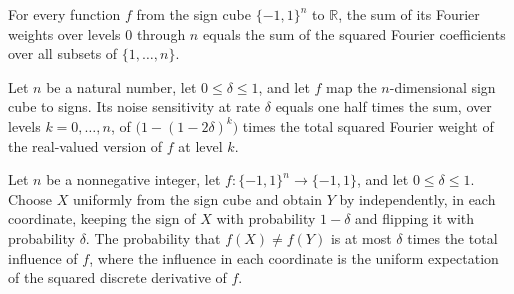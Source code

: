 \begin{theorem}
\label{FABL.sum_fourierWeightAtLevel_range}
\leanok
{}
For every function $f$ from the sign cube $\{-1,1\}^n$ to $\mathbb R$, the sum of its
Fourier weights over levels $0$ through $n$ equals the sum of the squared Fourier
coefficients over all subsets of $\{1,\ldots,n\}$.
\end{theorem}

\begin{theorem}
\label{FABL.noiseSensitivity_eq_sum_level}
\leanok
{}
Let $n$ be a natural number, let $0\le\delta\le1$, and let $f$ map the $n$-dimensional
sign cube to signs. Its noise sensitivity at rate $\delta$ equals one half times the
sum, over levels $k=0,\ldots,n$, of $\bigl(1-(1-2\delta)^k\bigr)$ times the total
squared Fourier weight of the real-valued version of $f$ at level $k$.
\end{theorem}

\begin{theorem}
\label{FABL.noiseSensitivity_le_delta_mul_totalInfluence}
\leanok
{}
Let $n$ be a nonnegative integer, let $f:\{-1,1\}^n\to\{-1,1\}$, and let
$0\leq\delta\leq1$. Choose $X$ uniformly from the sign cube and obtain $Y$ by
independently, in each coordinate, keeping the sign of $X$ with probability $1-\delta$
and flipping it with probability $\delta$. The probability that $f(X)\neq f(Y)$ is at
most $\delta$ times the total influence of $f$, where the influence in each coordinate
is the uniform expectation of the squared discrete derivative of $f$.
\end{theorem}


